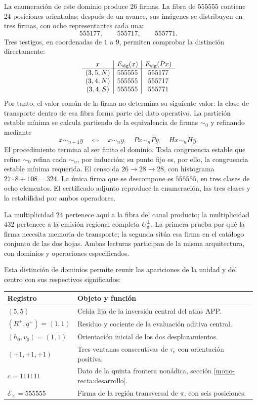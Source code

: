La enumeración de este dominio produce \(26\) firmas. La fibra de
\(555555\) contiene \(24\) posiciones orientadas; después de un
avance, sus imágenes se distribuyen en tres firmas, con ocho
representantes cada una:
\[
 555177,\qquad555717,\qquad555771.
\]
Tres testigos, en coordenadas de \(1\) a \(9\), permiten comprobar
la distinción directamente:
\[
\begin{array}{c|c|c}
x&E_{\rm sig}(x)&E_{\rm sig}(Px)\\\hline
(3,5,N)&555555&555177\\
(3,4,N)&555555&555717\\
(3,4,S)&555555&555771
\end{array}
\]
Por tanto, el valor común de la firma no determina su siguiente valor:
la clase de transporte dentro de esa fibra forma parte del dato
operativo. La partición estable mínima se calcula partiendo de la
equivalencia de firmas \(\sim_0\) y refinando mediante
\[
 x\sim_{n+1}y\quad\Longleftrightarrow\quad
 x\sim_n y,\quad Px\sim_n Py,\quad Hx\sim_n Hy.
\]
El procedimiento termina al ser finito el dominio. Toda congruencia
estable que refine \(\sim_0\) refina cada \(\sim_n\), por inducción;
su punto fijo es, por ello, la congruencia estable mínima requerida.
El censo da \(26\to28\to28\), con histograma
\(27\cdot8+108=324\). La única firma que se descompone es
\(555555\), en tres clases de ocho elementos. El certificado adjunto
reproduce la enumeración, las tres clases y la estabilidad por ambos
operadores.

La multiplicidad \(24\) pertenece aquí a la fibra del canal producto;
la multiplicidad \(432\) pertenece a la emisión regional completa
\(U_\pi^\perp\). La primera prueba por qué la firma necesita memoria
de transporte; la segunda sitúa esa firma en el catálogo conjunto de
las dos hojas. Ambas lecturas participan de la misma arquitectura,
con dominios y operaciones especificados.

Esta distinción de dominios permite reunir las apariciones de la unidad
y del centro con sus respectivos significados:
\begin{center}
\small
\begin{tabularx}{\textwidth}{@{}lX@{}}
\toprule
Registro & Objeto y función \\
\midrule
\((5,5)\) & Celda fija de la inversión central del atlas APP.\\
\((R^+,q^+)=(1,1)\) & Residuo y cociente de la evaluación aditiva central.\\
\((h_0,v_0)=(1,1)\) & Orientación inicial de los dos desplazamientos.\\
\((+1,+1,+1)\) & Tres ventanas consecutivas de \(\tau_e\) con orientación positiva.\\
\(c=111111\) & Dato de la quinta frontera nonádica, sección \ref{mono-recta:desarrollo}.\\
\(\mathcal E_\times=555555\) & Firma de la región transversal de \(\pi\), con seis posiciones.\\
\bottomrule
\end{tabularx}
\end{center}

